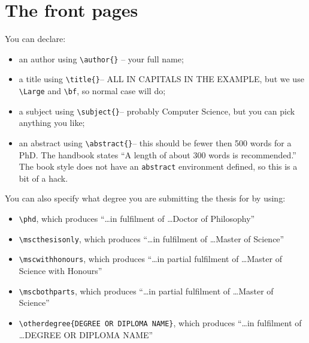 \chapter{The front pages}\label{C:ex}

You can declare:
\begin{itemize}
\item an author using  \verb+\author{}+ -- your full name;
\item a title using \verb+\title{}+-- ALL IN CAPITALS IN THE EXAMPLE, but we use \verb#\Large# and \verb#\bf#, so normal case will do;
\item a subject using \verb+\subject{}+-- probably Computer Science, but you can pick anything you like;
\item an abstract using \verb+\abstract{}+-- this should be fewer then 500 words for a PhD. The handbook states ``A length of about 300 words is recommended.'' The \textsf{book} style does not have an \verb+abstract+ environment defined, so this is a bit of a hack.
\end{itemize}

You can also specify what degree you are submitting the thesis for by using:
\begin{itemize}
\item  \verb+\phd+, which produces ``\ldots in fulfilment of \ldots Doctor of Philosophy''
\item  \verb+\mscthesisonly+, which produces ``\ldots in fulfilment of \ldots Master of Science''
\item  \verb+\mscwithhonours+, which produces ``\ldots in partial fulfilment of \ldots Master of Science with Honours''
\item  \verb+\mscbothparts+, which produces ``\ldots in partial fulfilment of \ldots Master of Science''
\item  \verb+\otherdegree{DEGREE OR DIPLOMA NAME}+, which produces ``\ldots in fulfilment of \ldots DEGREE OR DIPLOMA NAME''
\end{itemize}
